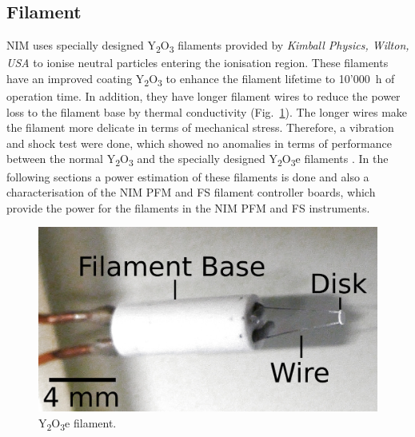 	\subsection{Filament}
		NIM uses specially designed Y\textsubscript{2}O\textsubscript{3} filaments provided by \textit{Kimball Physics, Wilton, USA} to ionise neutral particles entering the ionisation region. These filaments have an improved coating Y\textsubscript{2}O\textsubscript{3} to enhance the filament lifetime to 10'000~h of operation time. In addition, they have longer filament wires to reduce the power loss to the filament base by thermal conductivity (Fig.~\ref{fig:Y2O3Fil}). The longer wires make the filament more delicate in terms of mechanical stress. Therefore, a vibration and shock test were done, which showed no anomalies in terms of performance between the normal Y\textsubscript{2}O\textsubscript{3} and the specially designed Y\textsubscript{2}O\textsubscript{3}e filaments \cite{Diss_Fausch}. In the following sections a power estimation of these filaments is done and also a characterisation of the NIM PFM and FS filament controller boards, which provide the power for the filaments in the NIM PFM and FS instruments.
		\begin{figure}[h]
			\centering
			\includegraphics[width=.5\textwidth]{Bilder/Y2O3_filament.png}
			\caption{Y\textsubscript{2}O\textsubscript{3}e filament.}
			\label{fig:Y2O3Fil}
		\end{figure}

